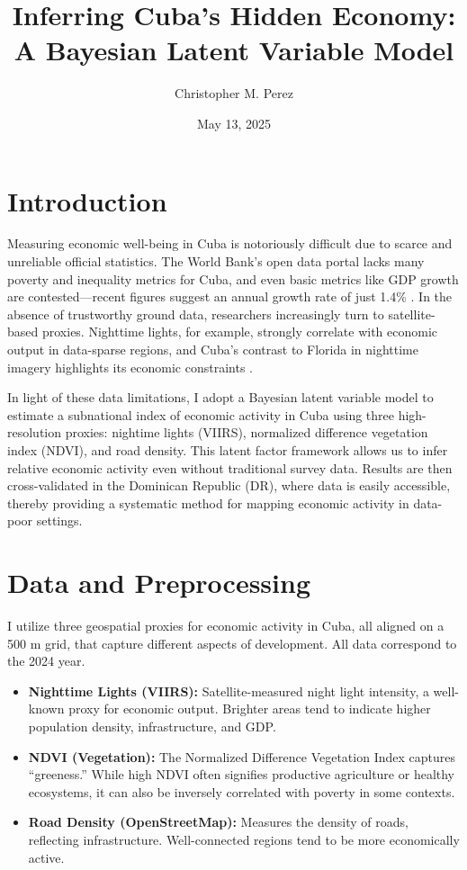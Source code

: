 \documentclass[12pt]{article}
\title{\textbf{Inferring Cuba's Hidden Economy: A Bayesian Latent Variable Model}}
\author{Christopher M. Perez}
\date{May 13, 2025}
\begin{document}
\maketitle
\tableofcontents
\newpage

\section{Introduction}
\label{sec:intro}

Measuring economic well-being in Cuba is notoriously difficult due to scarce and unreliable official statistics. The World Bank's open data portal lacks many poverty and inequality metrics for Cuba, and even basic metrics like GDP growth are contested---recent figures suggest an annual growth rate of just 1.4\% \parencite{worldbankcuba}. In the absence of trustworthy ground data, researchers increasingly turn to satellite-based proxies. Nighttime lights, for example, strongly correlate with economic output in data-sparse regions, and Cuba's contrast to  Florida in nighttime imagery highlights its economic constraints \parencite{steele2017poverty}.

In light of these data limitations, I adopt a Bayesian latent variable model to estimate a subnational index of economic activity in Cuba using three high-resolution proxies: nightime lights (VIIRS), normalized difference vegetation index (NDVI), and road density. This latent factor framework allows us to infer relative economic activity even without traditional survey data. Results are then cross-validated in the Dominican Republic (DR), where data is easily accessible, thereby providing a systematic method for mapping economic activity in data-poor settings.


\section{Data and Preprocessing}

I utilize three geospatial proxies for economic activity in Cuba, all aligned on a 500 m grid, that capture different aspects of development. All data correspond to the 2024 year.

\label{sec:data}
\begin{itemize}
  \item \textbf{Nighttime Lights (VIIRS):} Satellite-measured night light intensity, a well-known proxy for economic output. Brighter areas tend to indicate higher population density, infrastructure, and GDP.
  \item \textbf{NDVI (Vegetation):} The Normalized Difference Vegetation Index captures “greeness.” While high NDVI often signifies productive agriculture or healthy ecosystems, it can also be inversely correlated with poverty in some contexts.
  \item \textbf{Road Density (OpenStreetMap):} Measures the density of roads, reflecting infrastructure. Well-connected regions tend to be more economically active.
\end{itemize}
\end{document}
